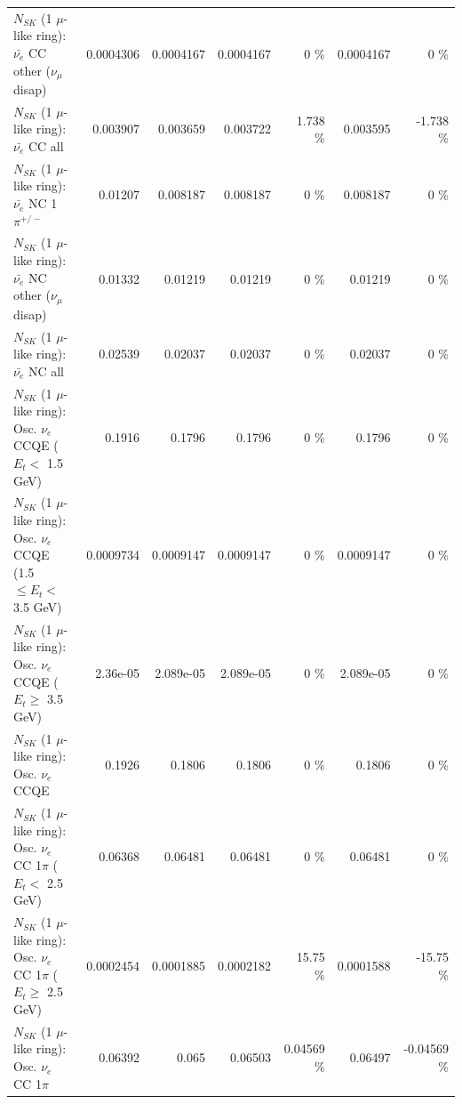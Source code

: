 \begin{table}
\begin{tabular}{| l | r | r | r  r | r  r |}
          $N_{SK}$ (1 $\mu$-like ring): $\bar{\nu_e}$ CC other ($\nu_\mu$ disap) &       0.0004306 &       0.0004167 &       0.0004167 &        0 \%  &       0.0004167 &        0 \%  \\ 
                            $N_{SK}$ (1 $\mu$-like ring): $\bar{\nu_{e}}$ CC all &        0.003907 &        0.003659 &        0.003722 &    1.738 \%  &        0.003595 &   -1.738 \%  \\ 
\hline
                     $N_{SK}$ (1 $\mu$-like ring): $\bar{\nu_e}$ NC 1$\pi^{+/-}$ &         0.01207 &        0.008187 &        0.008187 &        0 \%  &        0.008187 &        0 \%  \\ 
          $N_{SK}$ (1 $\mu$-like ring): $\bar{\nu_e}$ NC other ($\nu_\mu$ disap) &         0.01332 &         0.01219 &         0.01219 &        0 \%  &         0.01219 &        0 \%  \\ 
                            $N_{SK}$ (1 $\mu$-like ring): $\bar{\nu_{e}}$ NC all &         0.02539 &         0.02037 &         0.02037 &        0 \%  &         0.02037 &        0 \%  \\ 
\hline
\hline
\hline
             $N_{SK}$ (1 $\mu$-like ring): Osc. $\nu_e$ CCQE ($E_{t} <$ 1.5 GeV) &          0.1916 &          0.1796 &          0.1796 &        0 \%  &          0.1796 &        0 \%  \\ 
    $N_{SK}$ (1 $\mu$-like ring): Osc. $\nu_e$ CCQE (1.5 $\leq E_{t} <$ 3.5 GeV) &       0.0009734 &       0.0009147 &       0.0009147 &        0 \%  &       0.0009147 &        0 \%  \\ 
          $N_{SK}$ (1 $\mu$-like ring): Osc. $\nu_e$ CCQE ($E_{t} \geq$ 3.5 GeV) &        2.36e-05 &       2.089e-05 &       2.089e-05 &        0 \%  &       2.089e-05 &        0 \%  \\ 
\hline
                                 $N_{SK}$ (1 $\mu$-like ring): Osc. $\nu_e$ CCQE &          0.1926 &          0.1806 &          0.1806 &        0 \%  &          0.1806 &        0 \%  \\ 
\hline
        $N_{SK}$ (1 $\mu$-like ring): Osc. $\nu_e$ CC 1$\pi$ ($E_{t} <$ 2.5 GeV) &         0.06368 &         0.06481 &         0.06481 &        0 \%  &         0.06481 &        0 \%  \\ 
     $N_{SK}$ (1 $\mu$-like ring): Osc. $\nu_e$ CC 1$\pi$ ($E_{t} \geq$ 2.5 GeV) &       0.0002454 &       0.0001885 &       0.0002182 &    15.75 \%  &       0.0001588 &   -15.75 \%  \\ 
\hline
                            $N_{SK}$ (1 $\mu$-like ring): Osc. $\nu_e$ CC 1$\pi$ &         0.06392 &           0.065 &         0.06503 &  0.04569 \%  &         0.06497 & -0.04569 \%  \\ 

\end{tabular}
\end{table}
